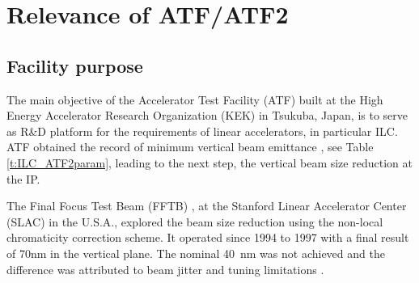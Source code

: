 \chapter{Relevance of ATF/ATF2}

\section{Facility purpose}
The main objective of the Accelerator Test Facility (ATF) built at the High Energy Accelerator Research Organization (KEK) in Tsukuba, Japan, is to serve as R\&D platform for the requirements of linear accelerators, in particular ILC. ATF obtained the record of minimum vertical beam emittance \cite{Kubo:2001ps,PhysRevLett.92.054802}, see Table \ref{t:ILC_ATF2param}, leading to the next step, the vertical beam size reduction at the IP.\par
The Final Focus Test Beam (FFTB) \cite{Berndt:1991ug}, at the Stanford Linear Accelerator Center (SLAC) in the  U.S.A., explored the beam size reduction using the non-local chromaticity correction scheme. It operated since 1994 to 1997 with a final result of 70nm in the vertical plane. The nominal 40~nm was not achieved and the difference was attributed to beam jitter and tuning limitations \cite{Araki1}.\par
